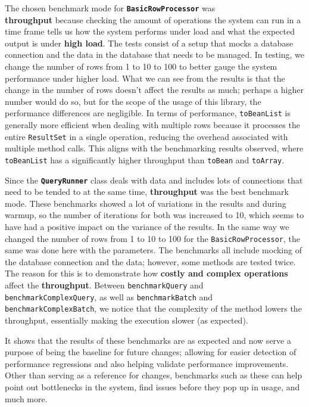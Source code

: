\documentclass[sigconf]{acmart}
\begin{document}
The chosen benchmark mode for \texttt{\textbf{BasicRowProcessor}} was\\ \textbf{throughput} because checking the amount of operations the system can run in a time frame tells us how the system performs under load and what the expected output is under \textbf{high load}. The tests consist of a setup that mocks a database connection and the data in the database that needs to be managed. In testing, we change the number of rows from 1 to 10 to 100 to better gauge the system performance under higher load. What we can see from the results is that the change in the number of rows doesn’t affect the results as much; perhaps a higher number would do so, but for the scope of the usage of this library, the performance differences are negligible. In terms of performance, \texttt{toBeanList} is generally more efficient when dealing with multiple rows because it processes the entire \texttt{ResultSet} in a single operation, reducing the overhead associated with multiple method calls. This aligns with the benchmarking results observed, where \texttt{toBeanList} has a significantly higher throughput than \texttt{toBean} and \texttt{toArray}.

Since the \texttt{\textbf{QueryRunner}} class deals with data and includes lots of connections that need to be tended to at the same time, \textbf{throughput} was the best benchmark mode. These benchmarks showed a lot of variations in the results and during warmup, so the number of iterations for both was increased to 10, which seems to have had a positive impact on the variance of the results. In the same way we changed the number of rows from 1 to 10 to 100 for the \texttt{BasicRowProcessor}, the same was done here with the parameters. The benchmarks all include mocking of the database connection and the data; however, some methods are tested twice. 
\\ The reason for this is to demonstrate how \textbf{costly and complex operations} affect the \textbf{throughput}. Between \texttt{benchmarkQuery} and \\ \texttt{benchmarkComplexQuery}, as well as \texttt{benchmarkBatch} and \\ \texttt{benchmarkComplexBatch}, we notice that the complexity of the method lowers the throughput, essentially making the execution slower (as expected).

\vspace{0.5cm}
It shows that the results of these benchmarks are as expected and now serve a purpose of being the baseline for future changes; allowing for easier detection of performance regressions and also helping validate performance improvements. Other than serving as a reference for changes, benchmarks such as these can help point out bottlenecks in the system, find issues before they pop up in usage, and much more.
\end{document}
